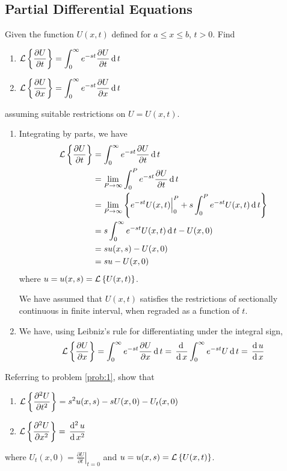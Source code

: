 \documentclass[../main-sheet.tex]{subfiles}
\begin{document}
\subsection{Partial Differential Equations}
\begin{prob}
    \label{prob:1}
    Given the function $ U(x,t) $ defined for $ a\leq x\leq b $, $ t>0 $. Find
    \begin{enumerate}[label=(\alph*)]
        \item $ \displaystyle\mathcal{L}\left\{ \frac{\partial U}{\partial t}\right\}=\int_0^\infty e^{-st}\frac{\partial U}{\partial t}\,\mathrm{d}\, t $
        \item $ \displaystyle\mathcal{L}\left\{ \frac{\partial U}{\partial x}\right\}=\int_0^\infty e^{-st}\frac{\partial U}{\partial x}\,\mathrm{d}\, t $
    \end{enumerate}
    assuming suitable restrictions on $ U=U(x,t) $.
\end{prob}
\begin{soln}
    \hfill 
    \begin{enumerate}[label=(\alph*)]
        \item Integrating by parts, we have
        \begin{align*}
            \mathcal{L}\left\{ \frac{\partial U}{\partial t}\right\}&=\int_0^\infty e^{-st}\frac{\partial U}{\partial t}\,\mathrm{d}\, t\\
            &=\lim_{P\to \infty}\int_0^P e^{-st}\frac{\partial U}{\partial t}\,\mathrm{d}\, t\\
            &=\lim_{P\to \infty}\left\{ e^{-st} U(x,t)\Big\rvert_0^P+ s\int_0^P e^{-st}U(x,t)\,\mathrm{d}\, t\right\}\\
            &= s\int_0^\infty e^{-st}U(x,t)\,\mathrm{d}\, t-U(x,0)\\
            &= su(x,s)-U(x,0)\\
            &= su-U(x,0)
        \end{align*}
        where $ u=u(x,s)=\mathcal{L}\left\{ U(x,t)\right\} $.

        We have assumed that $ U(x,t) $ satisfies the restrictions of sectionally continuous in finite interval, when regraded as a function of $ t $.
        \item We have, using Leibniz's rule for differentiating under the integral sign,
        \[\mathcal{L}\left\{ \frac{\partial U}{\partial x}\right\}=\int_0^\infty e^{-st}\frac{\partial U}{\partial x}\,\mathrm{d}\, t =\,\frac{\mathrm{d}\,}{\mathrm{d}\,x}\int_0^\infty e^{-st}U \,\mathrm{d}\, t=\,\frac{\mathrm{d}\,u}{\mathrm{d}\,x}\]
    \end{enumerate}
\end{soln}
\newpage
\begin{prob}
    \label{prob:2}
    Referring to problem \ref{prob:1}, show that
    \begin{enumerate}[label=(\alph*)]
        \item $ \displaystyle \mathcal{L}\left\{ \frac{\partial^2 U}{\partial t^2}\right\}=s^2u(x,s)-sU(x,0)-U_t(x,0) $
        \item $ \displaystyle \mathcal{L}\left\{ \frac{\partial^2 U}{\partial x^2}\right\}=\,\frac{\mathrm{d}^{2}\, u}{\mathrm{d}\, x^{2}} $
    \end{enumerate}
    where $\displaystyle U_t(x,0)=\left. \frac{\partial U}{\partial t}\right\vert_{t=0} $ and $ u=u(x,s)=\mathcal{L}\left\{ U(x,t)\right\} $.
\end{prob}
\end{document}
